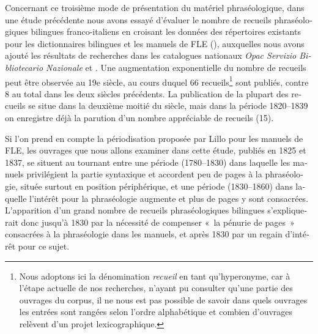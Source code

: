 \documentclass[output=paper,booklanguage=french]{langscibook}
\begin{document}
\begin{otherlanguage}{french}
Concernant ce troisième mode de présentation du matériel phraséologique, dans une étude précédente \citep{Murano2017} nous avons essayé d’évaluer le nombre de recueils phraséologiques bilingues franco-italiens en croisant les données des répertoires existants pour les dictionnaires bilingues \citep{Lillo2019} et les manuels de FLE (\citealt{Pellandra1997, Minerva1996}), auxquelles nous avons ajouté les résultats de recherches dans les catalogues nationaux \emph{Opac Servizio Bibliotecario Nazionale} et \citet{[CCF]}. Une augmentation exponentielle du nombre de recueils peut être observée au 19e siècle, au cours duquel 66 recueils\footnote{Nous adoptons ici la dénomination \emph{recueil} en tant qu’hyperonyme, car à l’étape actuelle de nos recherches, n’ayant pu consulter qu’une partie des ouvrages du corpus, il ne nous est pas possible de savoir dans quels ouvrages les entrées sont rangées selon l’ordre alphabétique et combien d’ouvrages relèvent d’un projet lexicographique.} sont publiés, contre 8 au total dans les deux siècles précédents. La publication de la plupart des recueils se situe dans la deuxième moitié du siècle, mais dans la période 1820--1839 on enregistre déjà la parution d’un nombre appréciable de recueils (15).

Si l’on prend en compte la périodisation proposée par Lillo pour les manuels de FLE, les ouvrages que nous allons examiner dans cette étude, publiés en 1825 et 1837, se situent au tournant entre une période (1780--1830) dans laquelle les manuels privilégient la partie syntaxique et accordent peu de pages à la phraséologie, située surtout en position périphérique, et une période (1830--1860) dans laquelle l’intérêt pour la phraséologie augmente et plus de pages y sont consacrées. L’apparition d’un grand nombre de recueils phraséologiques bilingues s’expliquerait donc jusqu’à 1830 par la nécessité de compenser «~la pénurie de pages~» consacrées à la phraséologie dans les manuels, et après 1830 par un regain d’intérêt pour ce sujet.


\end{otherlanguage}
\end{document}

